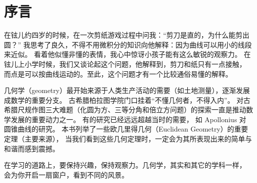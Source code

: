 \chapter{序言}

在铉儿约四岁的时候，在一次剪纸游戏过程中问我：“剪刀是直的，为什么能剪出圆？”
我思考了良久，不得不用微积分的知识向他解释：因为曲线可以用小的线段来近似。
看着他似懂非懂的表情，我心中惊讶小孩子能有这么敏锐的观察力。
在铉儿上小学时候，我们又谈论起这个问题，他解释到，剪刀和纸只有一点接触，
而点是可以按曲线运动的。至此，这个问题才有一个比较通俗易懂的解释。

几何学（geometry）最开始来源于人类生产活动的需要（如土地测量），逐渐发展成数学的重要分支。
古希腊柏拉图学院门口挂着“不懂几何者，不得入内”。 
对古希腊尺规作图三大难题（化圆为方、三等分角和倍立方问题）的探索一直是推动数学发展的重要动力之一。
有的研究已经远远超越当时的需要，
如 Apollonius 对圆锥曲线的研究。
本书列举了一些欧几里得几何（Euclidean Geometry）的重要定理（主要来源\cite{wikipedia,mathworld,mathsgreat}），
当我们看到这些几何定理时，一定会为其所表现出来的简单与和谐而感到震撼。

在学习的道路上，要保持兴趣，保持观察力。几何学，其实和其它的学科一样，
会为你开启一扇窗户，看到不同的风景。